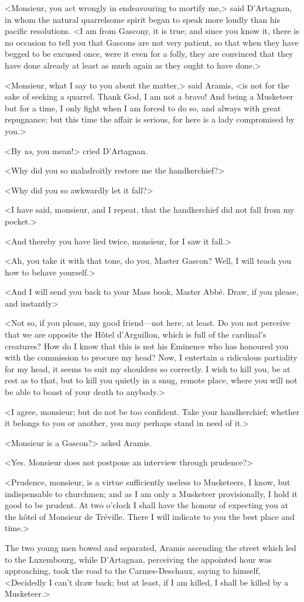<Monsieur, you act wrongly in endeavouring to mortify me,> said D'Artagnan, in whom the natural quarrelsome spirit began to speak more loudly than his pacific resolutions. <I am from Gascony, it is true; and since you know it, there is no occasion to tell you that Gascons are not very patient, so that when they have begged to be excused once, were it even for a folly, they are convinced that they have done already at least as much again as they ought to have done.> 

<Monsieur, what I say to you about the matter,> said Aramis, <is not for the sake of seeking a quarrel. Thank God, I am not a bravo! And being a Musketeer but for a time, I only fight when I am forced to do so, and always with great repugnance; but this time the affair is serious, for here is a lady compromised by you.> 

<By \emph{us}, you mean!> cried D'Artagnan. 

<Why did you so maladroitly restore me the handkerchief?> 

<Why did you so awkwardly let it fall?> 

<I have said, monsieur, and I repeat, that the handkerchief did not fall from my pocket.> 

<And thereby you have lied twice, monsieur, for I saw it fall.> 

<Ah, you take it with that tone, do you, Master Gascon? Well, I will teach you how to behave yourself.> 

<And I will send you back to your Mass book, Master Abbé. Draw, if you please, and instantly\longdash> 

<Not so, if you please, my good friend—not here, at least. Do you not perceive that we are opposite the Hôtel d'Arguillon, which is full of the cardinal's creatures? How do I know that this is not his Eminence who has honoured you with the commission to procure my head? Now, I entertain a ridiculous partiality for my head, it seems to suit my shoulders so correctly. I wish to kill you, be at rest as to that, but to kill you quietly in a snug, remote place, where you will not be able to boast of your death to anybody.> 

<I agree, monsieur; but do not be too confident. Take your handkerchief; whether it belongs to you or another, you may perhaps stand in need of it.> 

<Monsieur is a Gascon?> asked Aramis. 

<Yes. Monsieur does not postpone an interview through prudence?> 

<Prudence, monsieur, is a virtue sufficiently useless to Musketeers, I know, but indispensable to churchmen; and as I am only a Musketeer provisionally, I hold it good to be prudent. At two o'clock I shall have the honour of expecting you at the hôtel of Monsieur de Tréville. There I will indicate to you the best place and time.> 

The two young men bowed and separated, Aramis ascending the street which led to the Luxembourg, while D'Artagnan, perceiving the appointed hour was approaching, took the road to the Carmes-Deschaux, saying to himself, <Decidedly I can't draw back; but at least, if I am killed, I shall be killed by a Musketeer.> 
